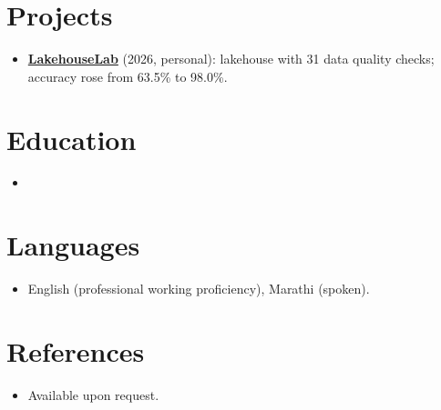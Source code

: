 \documentclass[11pt,a4paper,sans]{moderncv}
\begin{document}
\section{Projects}
\vspace{1pt}
\begin{itemize}
\item \textbf{\href{https://github.com/janedoe/lakehouse-lab}{LakehouseLab}} (2026, personal): lakehouse with 31 data quality checks; accuracy rose from 63.5\% to 98.0\%.
\end{itemize}

\section{Education}
\vspace{1pt}
\begin{itemize}

\item{}

\end{itemize}

\section{Languages}
\vspace{1pt}
\begin{itemize}
\item {English (professional working proficiency), Marathi (spoken).}
\end{itemize}

\section{References}
\vspace{1pt}
\begin{itemize}
\item{Available upon request.}
\end{itemize}
\end{document}
